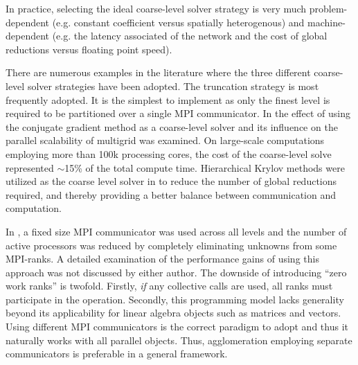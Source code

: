 \documentclass[]{siamart0216}
\begin{document}
In practice, selecting the ideal coarse-level solver strategy is very much 
problem-dependent (e.g. constant coefficient versus spatially heterogenous) 
and machine-dependent (e.g. the latency associated of the network and the 
cost of global reductions versus floating point speed).

There are numerous examples in the literature where the three different coarse-level solver strategies have been adopted.
The truncation strategy is most frequently adopted. It is the simplest to implement 
as only the finest level is required to be partitioned over a single MPI communicator. 
In \cite{gmeiner2014parallel, gmeiner2015performance, gmeiner2015towards} the effect of using 
the conjugate gradient method as a coarse-level solver 
and its influence on the parallel scalability of multigrid was examined. On large-scale computations employing more than 100k processing cores, 
the cost of the coarse-level solve represented $\sim$15\% of the total compute time. 
Hierarchical Krylov methods \cite{mcinnes2014hierarchical} were utilized as the coarse level solver in \cite{may2015scalable} to reduce the number of global reductions required, and thereby providing a better balance between communication and computation. 



In \cite{Adams:2004:UIF:1048933.1049978, sundar2012parallel}, a fixed size MPI communicator was used across all levels and 
the number of active processors was reduced by completely eliminating unknowns from some MPI-ranks.  
A detailed examination of the performance gains of using this approach was not discussed by either author.
The downside of introducing ``zero work ranks'' is twofold. 
Firstly, \textit{if} any collective calls are used, all ranks must participate in the operation. 
Secondly, this programming model lacks generality beyond its applicability for linear algebra objects such as matrices and vectors. 
Using different MPI communicators is the correct paradigm to adopt and thus it naturally works with all parallel objects. 
Thus, agglomeration employing separate communicators is preferable in a general framework.
\end{document}

